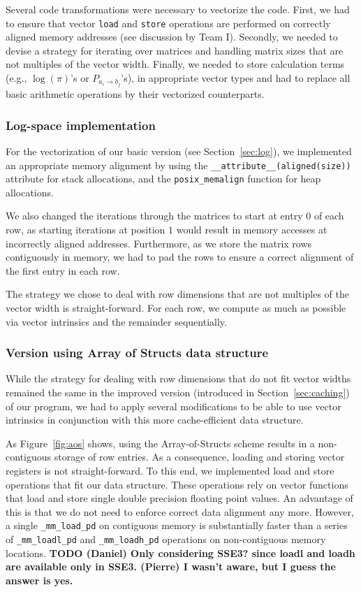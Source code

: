 \documentclass[runningheads,a4paper]{llncs}
\begin{document}
Several code transformations were necessary to vectorize the code.
First, we had to ensure that vector \texttt{load} and \texttt{store} operations are performed on correctly aligned memory addresses (see discussion by Team I).
Secondly, we needed to devise a strategy for iterating over matrices and handling matrix sizes that are not multiples of the vector width.
Finally, we needed to store calculation terms (e.g., $\log(\pi)$'s or $P_{a_i \to b_j}$'s), in appropriate vector types and
had to replace all basic arithmetic operations by their vectorized counterparts.

\subsubsection{Log-space implementation}
For the vectorization of our basic version (see Section~\ref{sec:log}), we implemented an appropriate memory alignment
by using the \texttt{\_\_attribute\_\_(aligned(\texttt{size}))} attribute for stack allocations,
and the \texttt{posix\_memalign} function for heap allocations.

We also changed the iterations through the matrices to start at entry $0$ of each row, as starting iterations at position $1$
would result in memory accesses at incorrectly aligned addresses.
Furthermore, as we store the matrix rows contiguously in memory,
we had to pad the rows to ensure a correct alignment of the first entry in each row.

The strategy we chose to deal with row dimensions that are not multiples of the vector width is straight-forward.
For each row, we compute as much as possible via vector intrinsics and the remainder sequentially.

\subsubsection{Version using Array of Structs data structure}
While the strategy for dealing with row dimensions that do not fit vector widths remained the same in the improved version (introduced in Section~\ref{sec:caching}) of our program,
we had to apply several modifications to be able to use vector intrinsics in conjunction with this more cache-efficient data structure.

As Figure~\ref{fig:aos} shows, using the Array-of-Structs scheme results in a non-contiguous storage of row entries.
As a consequence, loading and storing vector registers is not straight-forward.
To this end, we implemented load and store operations that fit our data structure.
These operations rely on vector functions that load and store single double precision floating point values.
An advantage of this is that we do not need to enforce correct data alignment any more.
However, a single  \texttt{\_mm\_load\_pd} on contiguous memory is substantially faster than a series of \texttt{\_mm\_loadl\_pd} and \texttt{\_mm\_loadh\_pd} operations
on non-contiguous memory locations. {\bf TODO (Daniel) Only considering SSE3? since loadl and loadh are available only in SSE3. (Pierre) I wasn't aware, but I guess the answer is yes.}
\end{document}
